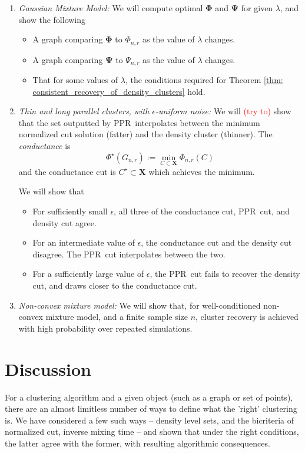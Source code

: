 \documentclass{article}
\newcommand{\1}{\mathbf{1}}
\newcommand{\Phibf}{\mathbf{\Phi}}
\newcommand{\Psibf}{\mathbf{\Psi}}
\newcommand{\Xbf}{\mathbf{X}}
\newcommand{\pprspace}{{\sc PPR~}}
\theoremstyle{aldenthm}
\theoremstyle{aldenrmrk}
\begin{document}
\begin{enumerate}
	\item 
	\textit{Gaussian Mixture Model:} 
	We will compute optimal $\Phibf$ and $\Psibf$ for given $\lambda$, and show the following
	\begin{itemize}
		\item A graph comparing $\Phibf$ to $\Phi_{n,r}$ as the value of $\lambda$ changes.
		\item A graph comparing $\Psibf$ to $\Psi_{n,r}$ as the value of $\lambda$ changes.
		\item That for some values of $\lambda$, the conditions required for Theorem \ref{thm: consistent_recovery_of_density_clusters} hold.
	\end{itemize}

	\item
	\textit{Thin and long parallel clusters, with $\epsilon$-uniform noise: }
	We will \textcolor{red}{(try to)} show that the set outputted by \pprspace interpolates between the minimum normalized cut solution (fatter) and the density cluster (thinner). The \emph{conductance} is
	\begin{equation*}
	\Phi^{\star}(G_{n,r}) := \min_{C \subset \Xbf} \Phi_{n,r}(C)
	\end{equation*}
	and the conductance cut is $C^{\star} \subset \Xbf$ which achieves the minimum.
	
	We will show that
	\begin{itemize}
		\item For sufficiently small $\epsilon$, all three of the conductance cut, \pprspace cut, and density cut agree.
		\item For an intermediate value of $\epsilon$, the conductance cut and the density cut disagree. The \pprspace cut interpolates between the two.
		\item For a sufficiently large value of $\epsilon$, the \pprspace cut fails to recover the density cut, and draws closer to the conductance cut.
	\end{itemize}

	\item 
	\textit{Non-convex mixture model:} We will show that, for well-conditioned non-convex mixture model, and a finite sample size $n$, cluster recovery is achieved with high probability over repeated simulations.
\end{enumerate}

\section{Discussion}
\label{sec: discussion}
For a clustering algorithm and a given object (such as a graph or set of points), there are an almost limitless number of ways to define what the 'right' clustering is. We have considered a few such ways -- density level sets, and the bicriteria of normalized cut, inverse mixing time -- and shown that under the right conditions, the latter agree with the former, with resulting algorithmic consequences.
\end{document}
